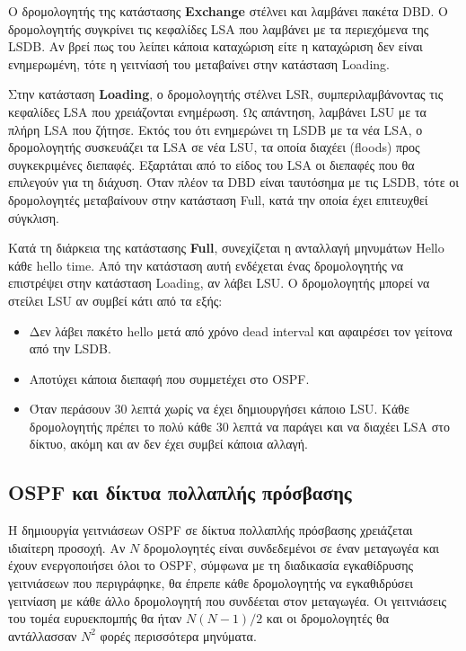 \documentclass{EdipyLabs} %
\begin{document}

Ο δρομολογητής της κατάστασης \textbf{Exchange} στέλνει και λαμβάνει πακέτα DBD. Ο δρομολογητής συγκρίνει τις κεφαλίδες LSA που λαμβάνει με τα περιεχόμενα της LSDB. Αν βρεί πως του λείπει κάποια καταχώριση είτε η καταχώριση δεν είναι ενημερωμένη, τότε η γειτνίασή του μεταβαίνει στην κατάσταση Loading.

Στην κατάσταση \textbf{Loading}, ο δρομολογητής στέλνει LSR, συμπεριλαμβάνοντας τις κεφαλίδες LSA που χρειάζονται ενημέρωση. Ως απάντηση, λαμβάνει LSU με τα πλήρη LSA που ζήτησε. Εκτός του ότι ενημερώνει τη LSDB με τα νέα LSA, ο δρομολογητής συσκευάζει τα LSA σε νέα LSU, τα οποία διαχέει (floods) προς συγκεκριμένες διεπαφές. Εξαρτάται από το είδος του LSA οι διεπαφές που θα επιλεγούν για τη διάχυση. Όταν πλέον τα DBD είναι ταυτόσημα με τις LSDB, τότε οι δρομολογητές μεταβαίνουν στην κατάσταση Full, κατά την οποία έχει επιτευχθεί σύγκλιση. 

Κατά τη διάρκεια της κατάστασης \textbf{Full}, συνεχίζεται η ανταλλαγή μηνυμάτων Hello κάθε hello time. Από την κατάσταση αυτή ενδέχεται ένας δρομολογητής να επιστρέψει στην κατάσταση Loading, αν λάβει LSU. Ο δρομολογητής μπορεί να στείλει LSU αν συμβεί κάτι από τα εξής:~
\begin{itemize}
	\item Δεν λάβει πακέτο hello μετά από χρόνο dead interval και αφαιρέσει τον γείτονα από την LSDB.
	\item Αποτύχει κάποια διεπαφή που συμμετέχει στο OSPF.
	\item Όταν περάσουν 30 λεπτά χωρίς να έχει δημιουργήσει κάποιο LSU. Κάθε δρομολογητής πρέπει το πολύ κάθε 30 λεπτά να παράγει και να διαχέει LSA στο δίκτυο, ακόμη και αν δεν έχει συμβεί κάποια αλλαγή.
\end{itemize}

\subsection{OSPF και δίκτυα πολλαπλής πρόσβασης}\label{sec:dr}

H δημιουργία γειτνιάσεων OSPF σε δίκτυα πολλαπλής πρόσβασης χρειάζεται ιδιαίτερη προσοχή. Αν $N$ δρομολογητές είναι συνδεδεμένοι σε έναν μεταγωγέα και έχουν ενεργοποιήσει όλοι το OSPF, σύμφωνα με τη διαδικασία εγκαθίδρυσης γειτνιάσεων που περιγράφηκε, θα έπρεπε κάθε δρομολογητής να εγκαθιδρύσει γειτνίαση με κάθε άλλο δρομολογητή που συνδέεται στον μεταγωγέα. Οι γειτνιάσεις του τομέα ευρυεκπομπής θα ήταν ${N(N-1)/2}$ και οι δρομολογητές θα αντάλλασσαν $N^2$ φορές περισσότερα μηνύματα.
\end{document}
